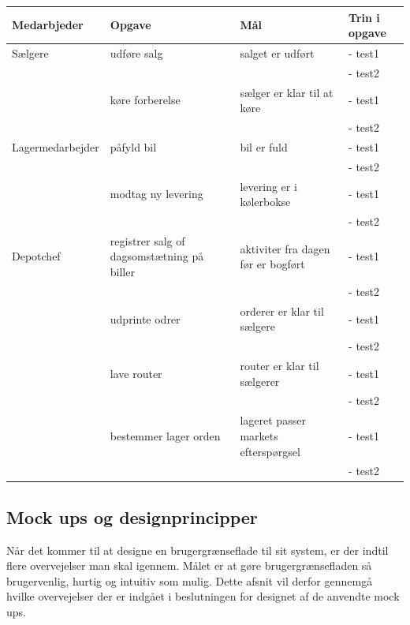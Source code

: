\begin{center}
\begin{tabular}{ |p{90pt}|p{90pt}|p{90pt}|p{90pt}| }
    \hline
    Medarbjeder & Opgave & Mål & Trin i opgave \\
    \hline\hline
    Sælgere
    & udføre salg & salget er udført &
    - test1 \\
    &&&
    - test2 \\
    \hline
    & køre forberelse & sælger er klar til at køre &
    - test1 \\
    &&&
    - test2 \\
    \hline
    Lagermedarbejder
    & påfyld bil & bil er fuld &
    - test1 \\
    &&&
    - test2 \\
    \hline
    & modtag ny levering & levering er i kølerbokse &
    - test1 \\
    &&&
    - test2 \\
    \hline
    Depotchef
    & registrer salg of dagsomstætning på biller & aktiviter fra dagen før er bogført &
    - test1 \\
    &&&
    - test2 \\
    \hline
    & udprinte odrer & orderer er klar til sælgere &
    - test1 \\
    &&&
    - test2 \\
    \hline
    & lave router & router er klar til sælgerer &
    - test1 \\
    &&&
    - test2 \\
    \hline
    & bestemmer lager orden & lageret passer markets efterspørgsel &
    - test1 \\
    &&&
    - test2 \\
    \hline
\end{tabular}
\end{center}

\subsection{Mock ups og designprincipper}
Når det kommer til at designe en brugergrænseflade til sit system, er der indtil flere overvejelser man skal igennem. Målet er at gøre brugergrænsefladen så brugervenlig, hurtig og intuitiv som mulig. Dette afsnit vil derfor gennemgå hvilke overvejelser der er indgået i beslutningen for designet af de anvendte mock ups.

